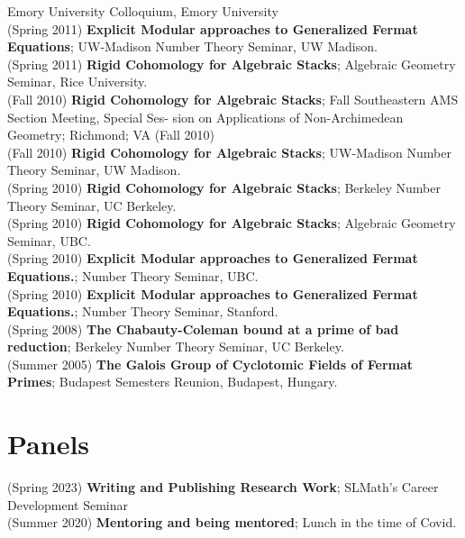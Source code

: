 \documentclass[margin,line]{res}
\begin{document}
\begin{resume}
Emory University Colloquium, Emory University
\vspace{.05cm}\\
(Spring 2011) \textbf{Explicit Modular approaches to Generalized Fermat Equations};
 UW-Madison Number Theory Seminar, UW Madison.
\vspace{.05cm}\\
(Spring 2011) \textbf{Rigid Cohomology for Algebraic Stacks};
Algebraic Geometry Seminar, Rice University.
\vspace{.05cm}\\
(Fall 2010) \textbf{Rigid Cohomology for Algebraic Stacks};
Fall Southeastern AMS Section Meeting, Special Ses-
sion on Applications of Non-Archimedean Geometry; Richmond; VA (Fall 2010)
\vspace{.05cm}\\
(Fall 2010) \textbf{Rigid Cohomology for Algebraic Stacks};
 UW-Madison Number Theory Seminar, UW Madison.
\vspace{.05cm}\\
(Spring 2010) \textbf{Rigid Cohomology for Algebraic Stacks};
 Berkeley Number Theory Seminar, UC Berkeley.
\vspace{.05cm}\\
(Spring 2010) \textbf{Rigid Cohomology for Algebraic Stacks};
Algebraic Geometry Seminar, UBC.
\vspace{.05cm}\\
(Spring 2010) \textbf{Explicit Modular approaches to Generalized Fermat Equations.};
 Number Theory Seminar, UBC.
\vspace{.05cm}\\
(Spring 2010) \textbf{Explicit Modular approaches to Generalized Fermat Equations.};
 Number Theory Seminar, Stanford.
\vspace{.05cm}\\
(Spring 2008) \textbf{The Chabauty-Coleman bound at a prime of bad reduction};
 Berkeley Number Theory Seminar, UC Berkeley.
\vspace{.05cm}\\
(Summer 2005) \textbf{The Galois Group of Cyclotomic Fields of Fermat Primes};
Budapest Semesters Reunion, Budapest, Hungary. 
\vspace{.05cm}\\
  
  
\section{\sc Panels}
(Spring 2023) \textbf{ Writing and Publishing Research Work};
SLMath's Career Development Seminar
\vspace{.05cm}\\  
(Summer 2020) \textbf{Mentoring and being mentored};
Lunch in the time of Covid. 
\vspace{.05cm}\\


\end{resume}
\end{document}
